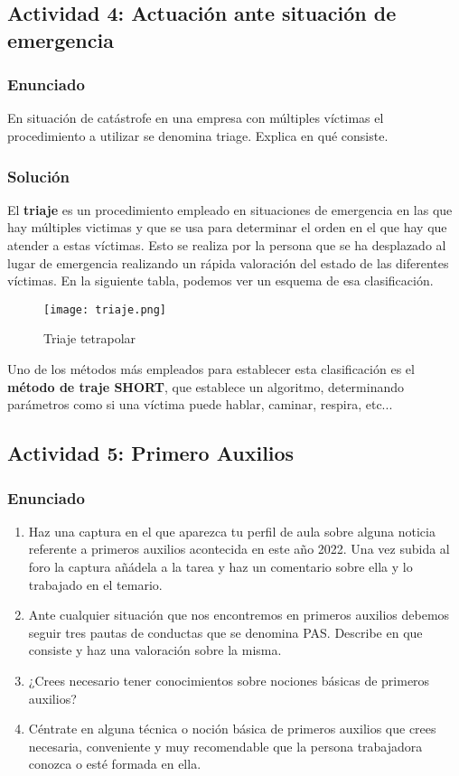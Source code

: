 \subsection{Actividad 4: Actuación ante situación de emergencia}

\subsubsection{Enunciado}
En situación de catástrofe en una empresa con múltiples víctimas el procedimiento a utilizar se denomina triage. Explica en qué consiste.

\subsubsection{Solución}
El \textbf{triaje} es un procedimiento empleado en situaciones de emergencia en las que hay múltiples victimas y que se usa para determinar el orden en el que hay que atender a estas víctimas. Esto se realiza por la persona que se ha desplazado al lugar de emergencia realizando un rápida valoración del estado de las diferentes víctimas. En la siguiente tabla, podemos ver un esquema de esa clasificación.

\begin{figure}[H]
    \centering
    \texttt{[image: triaje.png]}
    \caption{Triaje tetrapolar}
\end{figure}

Uno de los métodos más empleados para establecer esta clasificación es el \textbf{método de traje SHORT}, que establece un algoritmo, determinando parámetros como si una víctima puede hablar, caminar, respira, etc...


\subsection{Actividad 5: Primero Auxilios}

\subsubsection{Enunciado}

\begin{enumerate}[label=\alph*.]
    \item Haz una captura en el que aparezca tu perfil de aula sobre alguna noticia  referente a primeros auxilios acontecida en este año 2022. Una vez subida al foro la captura añádela a la tarea y haz un comentario sobre ella y lo trabajado en el temario.
    \item Ante cualquier situación que nos encontremos en primeros auxilios debemos seguir tres pautas de conductas que se denomina PAS. Describe en que consiste y haz una valoración sobre la misma.
    \item ¿Crees necesario tener conocimientos sobre nociones básicas de primeros auxilios?
    \item Céntrate en alguna técnica o noción básica de primeros auxilios que crees necesaria, conveniente y muy recomendable que la persona trabajadora conozca o esté formada en ella.
\end{enumerate}

